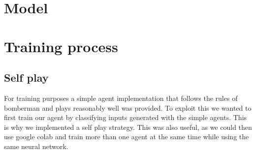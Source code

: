 \documentclass[12pt]{article}
\begin{document}
\section{Model}



\section{Training process}

\subsection{Self play}
For training purposes a simple agent implementation that follows the rules of bomberman and plays reasonably well was provided.
To exploit this we wanted to first train our agent by classifying inputs generated with the simple agents. %
This is why we implemented a self play strategy. This was also useful, as we could then use google colab and train more than one agent at the same time while using the same neural network.



\printbibliography
\end{document}
